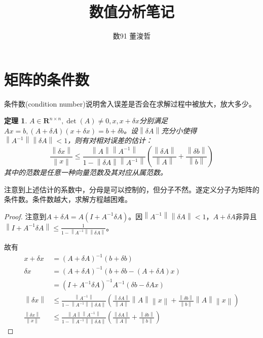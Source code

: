 \documentclass{ctexart}
\title{数值分析笔记}
\author{数91 董浚哲}
\begin{document}
\maketitle
\newcommand{\R}{\mathbf{R}}
\newcommand{\dd}{\,\mathrm{d}}
\newcommand{\st}{\text{ s.t. }}
\newcommand{\pp}[2]{\frac{\partial #1}{\partial #2}}
\newcommand{\fl}{\mathrm{fl}}
\newcommand{\nm}[1]{\left\|#1 \right\|}

\newtheorem{Thm}{定理}[section]
\newtheorem{Lemma}[Thm]{引理}
\newtheorem{Prop}[Thm]{命题}
\newtheorem{Cor}[Thm]{推论}
\newtheorem{Def}{定义}[section]
\newtheorem{Rmk}{注}[section]
\newtheorem{Eg}{例}[section]
\newenvironment{solution}{\begin{proof}[Solution]}{\end{proof}}


\section{矩阵的条件数}

条件数(condition number)说明舍入误差是否会在求解过程中被放大，放大多少。

\begin{Thm}
$A\in\R^{n\times n},\det(A)\neq 0, x,x+\delta x$分别满足$Ax=b,(A+\delta A)(x+\delta x)=b+\delta b$。设$\nm{\delta A}$充分小使得$\nm{A^{-1}}\nm{\delta A}<1$，则有对相对误差的估计：
\[\frac{\nm{\delta x}}{\nm{x}}\leq \frac{\nm{A}\nm{A^{-1}}}{1-\nm{\delta A}\nm{A^{-1}}}(\frac{\nm{\delta A}}{\nm{A}}+\frac{\nm{\delta b}}{\nm{b}})\]
其中的范数是任意一种向量范数及其对应从属范数。
\end{Thm}

注意到上述估计的系数中，分母是可以控制的，但分子不然。遂定义分子为矩阵的条件数。条件数越大，求解方程越困难。

\begin{proof}
注意到$A+\delta A=A(I+A^{-1}\delta A)$。因$\nm{A^{-1}}\nm{\delta A}<1$，$A+\delta A$非异且$\nm{I+A^{-1}\delta A}\leq\frac{1}{1-\nm{A^{-1}}\nm{\delta A}}$。

故有
\begin{align*}
x+\delta x&=(A+\delta A)^{-1}(b+\delta b)\\
\delta x&=(A+\delta A)^{-1}(b+\delta b-(A+\delta A)x)\\
&=(I+A^{-1}\delta A)^{-1}A^{-1}(\delta b-\delta A x)\\
\nm{\delta x}&\leq \frac{\nm{A^{-1}}}{1-\nm{A^{-1}}\nm{\delta A}}(\frac{\nm{\delta A}}{\nm{A}}\nm{A}\nm{x}+\frac{\nm{\delta b}}{\nm{b}}\nm{A}\nm{x})\\
\frac{\nm{\delta x}}{\nm{x}}&\leq \frac{\nm{A}\nm{A^{-1}}}{1-\nm{A^{-1}}\nm{\delta A}}(\frac{\nm{\delta A}}{\nm{A}}+\frac{\nm{\delta b}}{\nm{b}})
\end{align*}

\end{proof}
\end{document}

